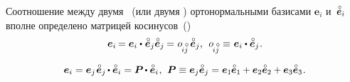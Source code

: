 \begin{otherlanguage}{russian}

Соотношение между двумя ~(или двумя ) орто\-нормаль\-ными базисами ${\bm{e}_i}$ и~${\mathcircabove{\bm{e}}_i}$ вполне определено матрицей косинусов~()
\nopagebreak\vspace{-0.5em}\[
\bm{e}_i \hspace{-0.2ex} = \bm{e}_i \dotp \hspace{.1ex} \tikzmark{beginEqualsE} \mathcircabove{\bm{e}}_j \mathcircabove{\bm{e}}_j \tikzmark{endEqualsE} \hspace{-0.1ex} = \hspace{.1ex} \cosinematrix{\hspace{-0.2ex}i\mathcircabove{j}} \, \mathcircabove{\bm{e}}_j , \:\:
\cosinematrix{\hspace{-0.2ex}i\mathcircabove{j}} \hspace{.1ex} \equiv \hspace{.1ex} \bm{e}_i \dotp \mathcircabove{\bm{e}}_j
\hspace{.1ex} .
\]

\vspace{-0.32em} \noindent {}
\begin{equation}\label{introductionofrotationtensor}
\bm{e}_i = \bm{e}_j \hspace{.16ex} \tikzmark{beginEqualsKroneckerDelta} \mathcircabove{\bm{e}}_j \hspace{-0.16ex} \dotp \mathcircabove{\bm{e}}_i \tikzmark{endEqualsKroneckerDelta} = \bm{P} \hspace{-0.16ex} \dotp \mathcircabove{\bm{e}}_i \hspace{.1ex}, \:\,
\bm{P} \equiv \bm{e}_j \mathcircabove{\bm{e}}_j = \scalebox{0.96}[1]{$\bm{e}_1 \hspace{-0.1ex} \mathcircabove{\bm{e}}_1 + \bm{e}_2 \mathcircabove{\bm{e}}_2 + \bm{e}_3 \mathcircabove{\bm{e}}_3$}
\hspace{.1ex} .
\end{equation}

\vspace{-0.32em} \noindent {}


\end{otherlanguage}
